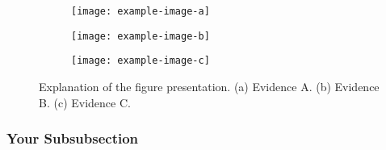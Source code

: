 \documentclass[11pt]{article}
\begin{document}
\blindtext

\begin{figure}[!hbt]
	\centering
	\begin{subfigure}[b]{0.38\textwidth}
		\texttt{[image: example-image-a]}
		\caption{}
		\label{fig:exampleImageA}		%
		\texttt{[image: example-image-b]}
		\caption{}
		\label{fig:exampleImageB}		%
	\end{subfigure}
	\begin{subfigure}[b]{0.6\textwidth}
		\centering
		\texttt{[image: example-image-c]}
		\caption{}
		\label{fig:exampleImageC}		%
	\end{subfigure}
	\caption{Explanation of the figure presentation. (a) Evidence A. (b) Evidence B. (c) Evidence C.}
	\label{fig:exampleImages}		%
\end{figure}

\blindtext

\blindtext

\subsubsection{Your Subsubsection}
\end{document}
